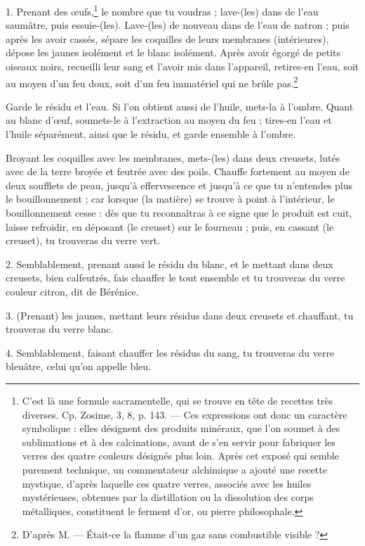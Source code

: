 \documentclass[a4paper, 11pt, oneside, polutonikogreek, french]{article}
\begin{document}
1. Prenant des œufs,\footnote{C'est là une formule sacramentelle, qui se trouve en tête de recettes très diverses. Cp. Zosime, 3, 8, p. 143. --- Ces expressions ont donc un caractère symbolique : elles désignent des produits minéraux, que l'on soumet à des sublimations et à des calcinations, avant de s'en servir pour fabriquer les verres des quatre couleurs désignés plus loin. Après cet exposé qui semble purement technique, un commentateur alchimique a ajouté une recette mystique, d'après laquelle ces quatre verres, associés avec les huiles mystérieuses, obtenues par la distillation ou la dissolution des corps métalliques, constituent le ferment d'or, ou pierre philosophale.} le nombre que tu voudras ; lave-(les) dans de l'eau saumâtre, puis essuie-(les). Lave-(les) de nouveau dans de l'eau de natron ; puis après les avoir cassés, sépare les coquilles de leurs membranes (intérieures), dépose les jaunes isolément et le blanc isolément. Après avoir égorgé de petits oiseaux noirs, recueilli leur sang et l'avoir mis dans l'appareil, retires-en l'eau, soit au moyen d'un feu doux, soit d'un feu immatériel qui ne brûle pas.\footnote{D'après M. --- Était-ce la flamme d'un gaz sans combustible visible ?}

Garde le résidu et l'eau. Si l'on obtient aussi de l'huile, mets-la à l'ombre. Quant au blanc d'œuf, soumets-le à l'extraction au moyen du feu ; tires-en l'eau et l'huile séparément, ainsi que le résidu, et garde ensemble à l'ombre.

Broyant les coquilles avec les membranes, mets-(les) dans deux creusets, lutés avec de la terre broyée et feutrée avec des poils. Chauffe fortement au moyen de deux soufflets de peau, jusqu'à effervescence et jusqu'à ce que tu n'entendes plus le bouillonnement ; car lorsque (la matière) se trouve à point à l'intérieur, le bouillonnement cesse : dès que tu reconnaîtras à ce signe que le produit est cuit, laisse refroidir, en déposant (le creuset) sur le fourneau ; puis, en cassant (le creuset), tu trouveras du verre vert.

2. Semblablement, prenant aussi le résidu du blanc, et le mettant dans deux creusets, bien calfeutrés, fais chauffer le tout ensemble et tu trouveras du verre couleur citron, dit de Bérénice.

3. (Prenant) les jaunes, mettant leurs résidus dans deux creusets et chauffant, tu trouveras du verre blanc.

4. Semblablement, faisant chauffer les résidus du sang, tu trouveras du verre bleuâtre, celui qu'on appelle bleu.
\end{document}
